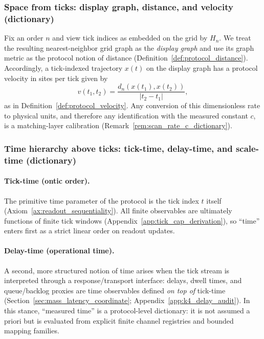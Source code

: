 \subsubsection{Space from ticks: display graph, distance, and velocity (dictionary)}
\label{subsubsec:space_from_ticks_dictionary}

Fix an order $n$ and view tick indices as embedded on the grid by $H_n$.
We treat the resulting nearest-neighbor grid graph as the \emph{display graph} and use its graph metric as the protocol notion of distance (Definition~\ref{def:protocol_distance}).
Accordingly, a tick-indexed trajectory $x(t)$ on the display graph has a protocol velocity in sites per tick given by
\[
v(t_1,t_2)=\frac{d_n(x(t_1),x(t_2))}{|t_2-t_1|},
\]
as in Definition~\ref{def:protocol_velocity}.
Any conversion of this dimensionless rate to physical units, and therefore any identification with the measured constant $c$, is a matching-layer calibration (Remark~\ref{rem:scan_rate_c_dictionary}).

\subsubsection{Time hierarchy above ticks: tick-time, delay-time, and scale-time (dictionary)}
\label{subsubsec:time_hierarchy_above_ticks_dictionary}

\paragraph{Tick-time (ontic order).}
\InterfaceTag The primitive time parameter of the protocol is the tick index $t$ itself (Axiom~\ref{ax:readout_sequentiality}).
All finite observables are ultimately functions of finite tick windows (Appendix~\ref{app:tick_cap_derivation}), so ``time'' enters first as a strict linear order on readout updates.

\paragraph{Delay-time (operational time).}
\InterfaceTag A second, more structured notion of time arises when the tick stream is interpreted through a response/transport interface: delays, dwell times, and queue/backlog proxies are time observables defined \emph{on top of} tick-time (Section~\ref{sec:mass_latency_coordinate}; Appendix~\ref{app:k4_delay_audit}).
In this stance, ``measured time'' is a protocol-level dictionary: it is not assumed a priori but is evaluated from explicit finite channel registries and bounded mapping families.

